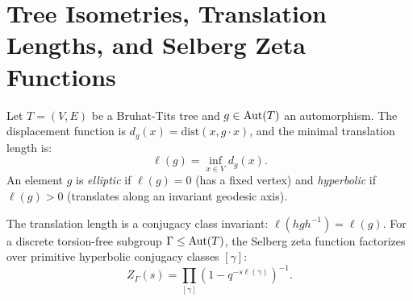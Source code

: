 \section{Tree Isometries, Translation Lengths, and Selberg Zeta Functions}

\begin{definition}
\label{def:tree_translation}
\leanok
Let $T = (V, E)$ be a Bruhat-Tits tree and $g \in \mathrm{Aut}(T)$ an automorphism. The displacement function is $d_g(x) = \mathrm{dist}(x, g \cdot x)$, and the minimal translation length is:
\[
\ell(g) = \inf_{x \in V} d_g(x).
\]
An element $g$ is \emph{elliptic} if $\ell(g) = 0$ (has a fixed vertex) and \emph{hyperbolic} if $\ell(g) > 0$ (translates along an invariant geodesic axis).
\end{definition}

\begin{theorem}
\label{thm:selberg_euler_factor}
\leanok
The translation length is a conjugacy class invariant: $\ell(h g h^{-1}) = \ell(g)$. For a discrete torsion-free subgroup $\Gamma \le \mathrm{Aut}(T)$, the Selberg zeta function factorizes over primitive hyperbolic conjugacy classes $[\gamma]$:
\[
Z_\Gamma(s) = \prod_{[\gamma]} \left(1 - q^{-s \ell(\gamma)}\right)^{-1}.
\]
\end{theorem}
